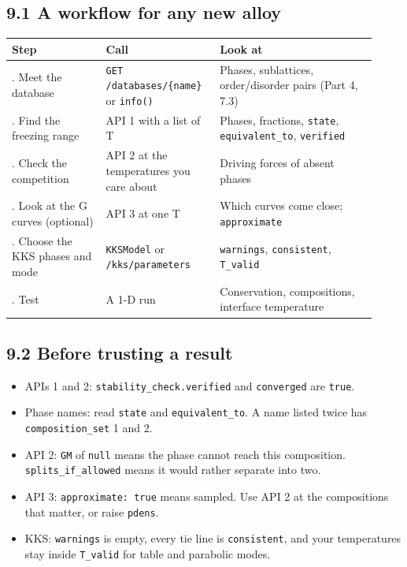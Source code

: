 \documentclass[12pt,a4paper]{article}
\begin{document}
\subsection*{9.1 A workflow for any new alloy}
\begingroup\small
\begin{longtable}{>{\raggedright\arraybackslash}p{0.245\linewidth}>{\raggedright\arraybackslash}p{0.268\linewidth}>{\raggedright\arraybackslash}p{0.408\linewidth}}
\toprule
\textbf{Step} & \textbf{Call} & \textbf{Look at} \\
\midrule
\endhead
1. Meet the database & \texttt{GET /\allowbreak{}databases/\allowbreak{}\{name\}} or \texttt{info()} & Phases, sublattices, order/disorder pairs (Part 4, 7.3) \\
2. Find the freezing range & API 1 with a list of T & Phases, fractions, \texttt{state}, \texttt{equivalent\_\allowbreak{}to}, \texttt{verified} \\
3. Check the competition & API 2 at the temperatures you care about & Driving forces of absent phases \\
4. Look at the G curves (optional) & API 3 at one T & Which curves come close; \texttt{approximate} \\
5. Choose the KKS phases and mode & \texttt{KKSModel} or \texttt{/\allowbreak{}kks/\allowbreak{}parameters} & \texttt{warnings}, \texttt{consistent}, \texttt{T\_\allowbreak{}valid} \\
6. Test & A 1-D run & Conservation, compositions, interface temperature \\
\bottomrule
\end{longtable}
\endgroup

\subsection*{9.2 Before trusting a result}
\begin{itemize}
\item APIs 1 and 2: \texttt{stability\_\allowbreak{}check.\allowbreak{}verified} and \texttt{converged} are \texttt{true}.
\item Phase names: read \texttt{state} and \texttt{equivalent\_\allowbreak{}to}. A name listed twice has \texttt{composition\_\allowbreak{}set} 1 and 2.
\item API 2: \texttt{GM} of \texttt{null} means the phase cannot reach this composition. \texttt{splits\_\allowbreak{}if\_\allowbreak{}allowed} means it would rather separate into two.
\item API 3: \texttt{approximate: true} means sampled. Use API 2 at the compositions that matter, or raise \texttt{pdens}.
\item KKS: \texttt{warnings} is empty, every tie line is \texttt{consistent}, and your temperatures stay inside \texttt{T\_\allowbreak{}valid} for table and parabolic modes.
\end{itemize}
\end{document}
